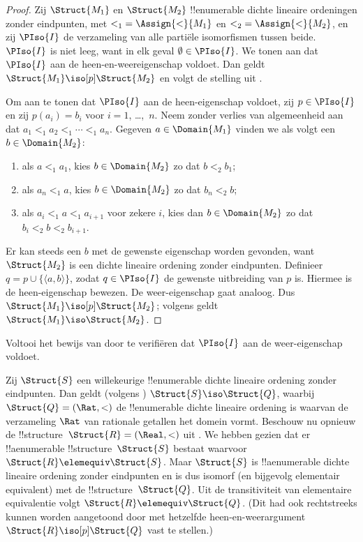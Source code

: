 \documentclass[../../../include/open-logic-section]{subfiles}
\begin{document}
\begin{proof}
  Zij $\Struct{M_1}$ en $\Struct{M_2}$ !!{enumerable} dichte lineaire
  ordeningen zonder eindpunten, met ${<_1} = \Assign{<}{M_1}$ en ${<_2} =
  \Assign{<}{M_2}$, en zij $\PIso{I}$ de verzameling van alle partiële
  isomorfismen tussen beide. $\PIso{I}$ is niet leeg, want in elk geval
  $\emptyset \in \PIso{I}$. We tonen aan dat $\PIso{I}$ aan de
  heen-en-weereigenschap voldoet. Dan geldt $\Struct{M_1} \iso[p] \Struct{M_2}$
  en volgt de stelling uit .

  Om aan te tonen dat $\PIso{I}$ aan de heen-eigenschap voldoet, zij $p \in
  \PIso{I}$ en zij $p(a_i) = b_i$ voor $i = 1$, \dots,~$n$. Neem
  zonder verlies van algemeenheid aan dat $a_1 <_1 a_2 <_1 \cdots <_1
  a_n$. Gegeven $a \in \Domain{M_1}$ vinden we als volgt een
  $b \in \Domain{M_2}$:
  \begin{enumerate}
  \item als $a <_1 a_1$, kies $b \in \Domain{M_2}$ zo dat $b <_2
    b_1$;
  \item als $a_n <_1 a$, kies $b \in \Domain{M_2}$ zo dat $b_n <_2 b$;
 \item als $a_i <_1 a <_1 a_{i+1}$ voor zekere $i$, kies dan $b \in
   \Domain{M_2}$ zo dat $b_i <_2 b <_2 b_{i+1}$.
  \end{enumerate}
  Er kan steeds een $b$ met de gewenste eigenschap worden gevonden, want
  $\Struct{M_2}$ is een dichte lineaire ordening zonder eindpunten. Definieer
  $q = p \cup \{ \langle a, b \rangle \}$, zodat $q \in \PIso{I}$ de
  gewenste uitbreiding van $p$ is. Hiermee is de heen-eigenschap
  bewezen. De weer-eigenschap gaat analoog. Dus $\Struct{M_1} \iso[p]
  \Struct{M_2}$; volgens  geldt $\Struct{M_1} \iso
  \Struct{M_2}$.
\end{proof}

\begin{prob}
  Voltooi het bewijs van  door
  te verifiëren dat $\PIso{I}$ aan de weer-eigenschap voldoet.
\end{prob}

\begin{rem}
  Zij $\Struct{S}$ een willekeurige !!{enumerable} dichte lineaire ordening zonder
  eindpunten. Dan geldt (volgens ) $\Struct{S} \iso
  \Struct{Q}$, waarbij $\Struct{Q} = (\Rat, <)$ de !!{enumerable}
  dichte lineaire ordening is waarvan de verzameling $\Rat$ van rationale getallen
  het domein vormt. Beschouw nu opnieuw de !!{structure}~$\Struct{R} =
  (\Real, <)$ uit . We hebben gezien dat er
  !!a{enumerable} !!{structure}~$\Struct{S}$ bestaat waarvoor $\Struct{R}
  \elemequiv \Struct{S}$. Maar $\Struct{S}$ is !!a{enumerable} dichte
  lineaire ordening zonder eindpunten en is dus isomorf (en bijgevolg
  elementair equivalent) met de !!{structure}~$\Struct{Q}$. Uit de
  transitiviteit van elementaire equivalentie volgt $\Struct{R} \elemequiv
  \Struct{Q}$. (Dit had ook rechtstreeks kunnen worden aangetoond door met
  hetzelfde heen-en-weerargument $\Struct{R} \iso[p] \Struct{Q}$ vast te
  stellen.)
\end{rem}
\end{document}
